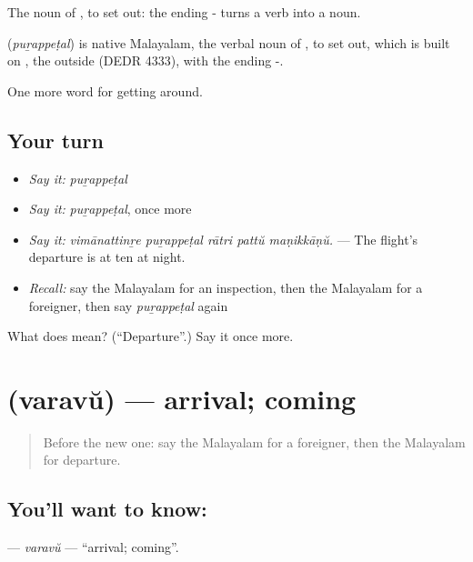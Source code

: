 The noun of , to set out: the ending - turns a verb into a noun.

\begin{cousinweb}
\textbf{} (\emph{puṟappeṭal}) is native Malayalam, the verbal noun of , to set out, which is built on , the outside (DEDR 4333), with the ending -.
\end{cousinweb}

\begin{grammarlens}[title={What you've built}]
One more word for getting around.
\end{grammarlens}

\subsection*{Your turn}
\begin{itemize}
\raggedright
  \item \emph{Say it:} \emph{puṟappeṭal}
  \item \emph{Say it:} \emph{puṟappeṭal}, once more
  \item \emph{Say it:} \emph{vimānattinṟe puṟappeṭal rātri pattŭ maṇikkāṇŭ.} — The flight's departure is at ten at night.
  \item \emph{Recall:} say the Malayalam for an inspection, then the Malayalam for a foreigner, then say \emph{puṟappeṭal} again
\end{itemize}

\begin{tcolorbox}[breakable,colback=teal!4,colframe=teal!35!black,title={Before you move on}]
What does  mean? (\textquotedblleft{}Departure\textquotedblright{}.) Say it once more.
\end{tcolorbox}
\section[\texorpdfstring{\ml{വരവ്} (varavŭ)}{വരവ് (varavŭ)}]{ (varavŭ) — arrival; coming}

\label{lesson:ML-C465-varavu}



\begin{quote}
Before the new one: say the Malayalam for a foreigner, then the Malayalam for departure.
\end{quote}

\subsection*{You'll want to know: }
\textbf{} — \emph{varavŭ} — \textquotedblleft{}arrival; coming\textquotedblright{}.

